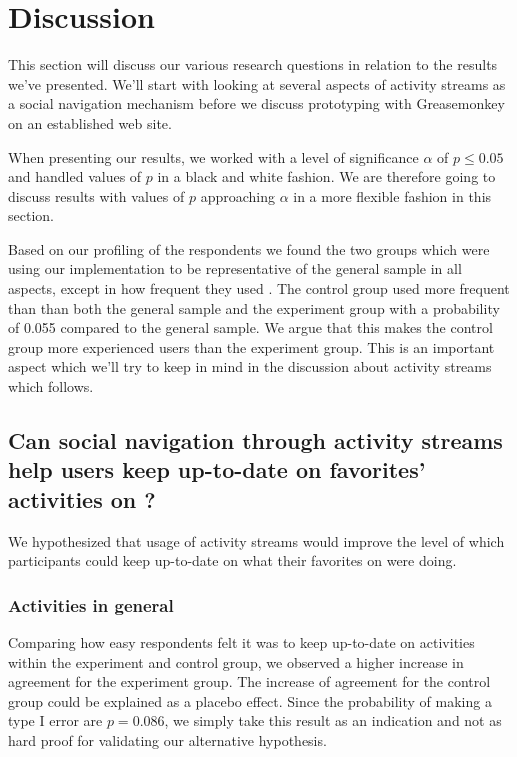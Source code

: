 \section{Discussion}

This section will discuss our various research questions in relation
to the results we've presented. We'll start with looking at
several aspects of activity streams as a social navigation
mechanism before we discuss prototyping with Greasemonkey on
an established web site.

When presenting our results, we worked with a level of significance
$\alpha$ of $p \leq 0.05$%
and handled values of $p$ in a black and white fashion.
We are therefore going to discuss results with values of $p$ approaching
$\alpha$ in a more flexible fashion in this section.

Based on our profiling of the respondents%
we found the two groups which were using our implementation to be
representative of the general sample in all aspects, except in how
frequent they used \urort{}. The control group used \urort{} more
frequent than than both the general sample and the experiment group
with a probability of 0.055 compared to the general sample.
We argue that this makes the control group more experienced
\urort{} users than the experiment group.
This is an important aspect which we'll try to keep in mind in
the discussion about activity streams which follows.

\subsection{%
  Can social navigation through activity streams help users keep
  up-to-date on favorites' activities on \urort{}?
}

We hypothesized that usage of activity streams would improve the level
of which participants could keep up-to-date on what their favorites
on \urort{} were doing.

\subsubsection{Activities in general}

Comparing how easy respondents felt it was to keep up-to-date on activities
within the experiment and control group,%
we observed a higher increase in agreement for the experiment group. The
increase of agreement for the control group could be explained as
a placebo effect.
Since the probability of making a type I error are
$p = 0.086$, we simply take this result as an indication and not as hard proof
for validating our alternative hypothesis.

